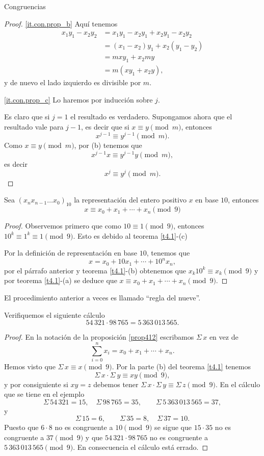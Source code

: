 \begin{section}{Congruencias}
\begin{proof}
\ref{it.con.prop_b} Aquí tenemos
$$
\begin{aligned}
x_1y_1-x_2y_2 &=  x_1y_1-x_2y_1+ x_2y_1-x_2y_2 \\
&= (x_1-x_2)y_1+ x_2(y_1 -y_2) \\
&= mxy_1 +x_2my \\
&= m(xy_1+x_2y),
\end{aligned}
$$
y de nuevo el lado izquierdo es divisible por $m$.

\ref{it.con.prop_c}  Lo haremos por inducción sobre $j$. 

Es claro que si $j=1$ el resultado es verdadero. Supongamos ahora que el resultado vale para $j-1$, es decir que si  $x \equiv y \pmod{m}$, entonces 
$$
x^{j-1} \equiv y^{j-1} \pmod{m}.
$$
Como $x \equiv y \pmod{m}$,  por   { (b)} tenemos que 
$$
x^{j-1}x \equiv y^{j-1}y  \pmod{m},
$$
es decir 
$$
x^j \equiv y^j \pmod{m}.
$$
\end{proof}


\begin{proposicion}\label{prop412}
Sea $(x_nx_{n-1}\ldots x_0)_{10}$ la
representación del entero positivo $x$ en base $10$, entonces
$$
x \equiv x_0+x_1+\cdots+x_n \pmod{9}
$$
\end{proposicion}
\begin{proof}
 Observemos primero que como $10\equiv 1\pmod{9}$, entonces  $10^k\equiv 1^k \equiv 1\pmod{9}$. Esto es debido  al teorema \ref{t4.1}-{(c)} 

Por la definición de representación en base $10$, tenemos que 
$$x=x_0 + 10x_1+ \cdots+10^nx_n,$$ 
por el párrafo anterior y teorema \ref{t4.1}-{(b)}  obtenemos que $x_k10^k \equiv x_k \pmod{9}$ y por
teorema \ref{t4.1}-{(a)} se deduce que $x \equiv
x_0+x_1+\cdots+x_n \pmod{9}$.
\end{proof}

El procedimiento anterior a veces es llamado ``regla del nueve''.

\begin{ejemplo*} Verifiquemos  el siguiente cálculo
$$
54\,321 \cdot 98\,765= 5\,363\,013\,565.
$$
\end{ejemplo*}
\begin{proof}
En la notación de la proposición \ref{prop412} escribamos $\Sigma\, x$ en vez de $$\sum_{i=0}^n x_i = x_0+x_1+\cdots+x_n.$$
Hemos visto que $\Sigma\, x \equiv x \pmod{9}$. Por la parte (b) del
teorema \ref{t4.1} tenemos
$$
\Sigma\, x \cdot\Sigma\ y \equiv xy \pmod{9},
$$
y por consiguiente si $xy=z$ debemos tener $\Sigma\, x \cdot \Sigma\, y \equiv\Sigma\, z \pmod{9}$. 
En el cálculo que se tiene en el ejemplo
$$
\Sigma\, 54\,321=15,\quad \Sigma\, 98\,765=35,\qquad \Sigma\, 5\,363\,013\,565=37,
$$
y
$$
\Sigma\, 15=6, \qquad \Sigma\, 35=8,\quad \Sigma\, 37=10.
$$
Puesto que $6 \cdot 8$ no es congruente a $10 \pmod{9}$ se sigue
que $15 \cdot 35$ no es congruente a $37 \pmod{9}$ y que $54\,321
\cdot 98\,765$ no es congruente a $5\,363\,013\,565\pmod{9}$. En
consecuencia el cálculo está errado.
\end{proof}


\end{section}

